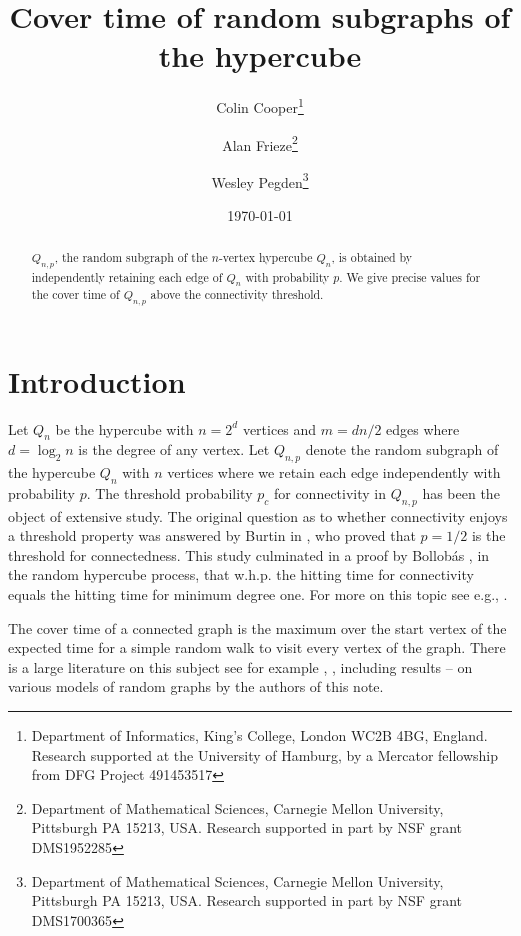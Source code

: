 \documentclass[12pt]{article}
\begin{document}
\author{Colin Cooper\thanks{Department of Informatics, King's College, London WC2B 4BG, England. Research supported  at the University of Hamburg, by a  Mercator fellowship from DFG  Project 491453517}
\and
Alan Frieze\thanks{Department of Mathematical Sciences, Carnegie Mellon University, Pittsburgh PA 15213, USA. Research supported in part by NSF grant DMS1952285}
\and
Wesley Pegden\thanks{Department of Mathematical Sciences, Carnegie Mellon University, Pittsburgh PA 15213, USA. Research supported in part by NSF grant DMS1700365}
}
\date{\today}
\title{Cover time of random subgraphs of the hypercube}
\maketitle

\begin{abstract}
$Q_{n,p}$, the random subgraph of the $n$-vertex hypercube $Q_n$, is obtained by independently retaining each edge of $Q_n$ with probability $p$.
We give precise values for the cover time of $Q_{n,p}$ above the connectivity threshold.
\end{abstract}


\section{Introduction}

Let $Q_n$ be the hypercube with $n=2^d$ vertices  and $m=dn/2$ edges where $d=\log_2 n$ is the degree of any vertex.  Let $Q_{n,p}$ denote the random subgraph of the hypercube $Q_n$ with $n$ vertices where we retain each edge independently with probability $p$.
The threshold probability $p_c$ for connectivity in $Q_{n,p}$ has been the object of extensive study.
The original question as to whether connectivity enjoys a threshold property
was answered by Burtin in \cite{Burtin},
who proved that $p = 1/2$ is the threshold for connectedness.
This study  culminated in a proof by Bollob\'as \cite{BoHC}, in the random hypercube process, that  w.h.p. the hitting time for connectivity equals the hitting time  for minimum degree one. For more on this topic see e.g., \cite{FK}.

The cover time of a connected graph %
is the maximum over the start vertex  of the expected time  for a simple random walk to visit every vertex of the graph. There is a large literature on this subject  see for example \cite{AFill}, \cite{LPW}, including results \cite{CF1}--\cite{Hyp} on various models of random graphs  by the authors of this note.
\end{document}
